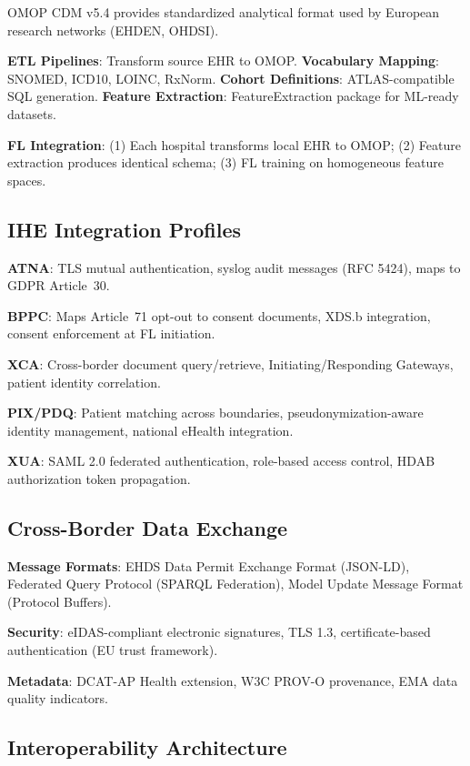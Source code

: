 \documentclass[conference]{IEEEtran}
\begin{document}
OMOP CDM v5.4 provides standardized analytical format used by European research networks (EHDEN, OHDSI).

\textbf{ETL Pipelines}: Transform source EHR to OMOP. \textbf{Vocabulary Mapping}: SNOMED, ICD10, LOINC, RxNorm. \textbf{Cohort Definitions}: ATLAS-compatible SQL generation. \textbf{Feature Extraction}: FeatureExtraction package for ML-ready datasets.

\textbf{FL Integration}: (1) Each hospital transforms local EHR to OMOP; (2) Feature extraction produces identical schema; (3) FL training on homogeneous feature spaces.

\subsection{IHE Integration Profiles}

\textbf{ATNA}: TLS mutual authentication, syslog audit messages (RFC 5424), maps to GDPR Article~30.

\textbf{BPPC}: Maps Article~71 opt-out to consent documents, XDS.b integration, consent enforcement at FL initiation.

\textbf{XCA}: Cross-border document query/retrieve, Initiating/Responding Gateways, patient identity correlation.

\textbf{PIX/PDQ}: Patient matching across boundaries, pseudonymization-aware identity management, national eHealth integration.

\textbf{XUA}: SAML 2.0 federated authentication, role-based access control, HDAB authorization token propagation.

\subsection{Cross-Border Data Exchange}

\textbf{Message Formats}: EHDS Data Permit Exchange Format (JSON-LD), Federated Query Protocol (SPARQL Federation), Model Update Message Format (Protocol Buffers).

\textbf{Security}: eIDAS-compliant electronic signatures, TLS 1.3, certificate-based authentication (EU trust framework).

\textbf{Metadata}: DCAT-AP Health extension, W3C PROV-O provenance, EMA data quality indicators.

\subsection{Interoperability Architecture}
\end{document}
